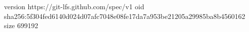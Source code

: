 version https://git-lfs.github.com/spec/v1
oid sha256:5f304fed6140d024d07afc7048e08fe17da7a953be21205a29985ba8b4560162
size 699192

